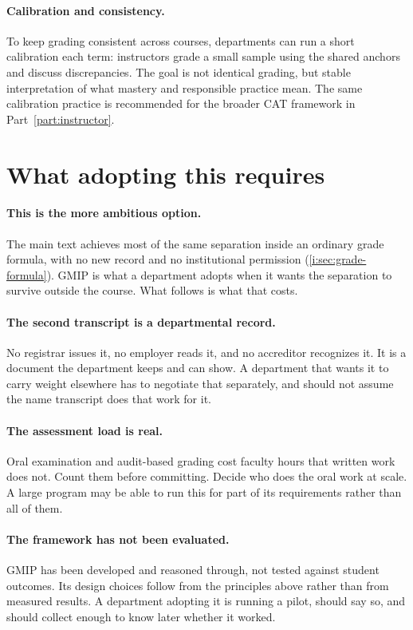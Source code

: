 \documentclass{SIAMbook2023}
\begin{document}
\paragraph{Calibration and consistency.}
To keep grading consistent across courses, departments can run a short calibration each term: instructors grade a small sample using the shared anchors and discuss discrepancies. The goal is not identical grading, but stable interpretation of what mastery and responsible practice mean. The same calibration practice is recommended for the broader CAT framework in Part~\ref{part:instructor}.

\section{What adopting this requires}
\label{app:gmip-adoption}%

\paragraph{This is the more ambitious option.}
The main text achieves most of the same separation inside an ordinary grade formula, with no new record and no institutional permission (\cref{i:sec:grade-formula}). GMIP is what a department adopts when it wants the separation to survive outside the course. What follows is what that costs.

\paragraph{The second transcript is a departmental record.}
No registrar issues it, no employer reads it, and no accreditor recognizes it. It is a document the department keeps and can show. A department that wants it to carry weight elsewhere has to negotiate that separately, and should not assume the name transcript does that work for it.

\paragraph{The assessment load is real.}
Oral examination and audit-based grading cost faculty hours that written work does not. Count them before committing. Decide who does the oral work at scale. A large program may be able to run this for part of its requirements rather than all of them.

\paragraph{The framework has not been evaluated.}
GMIP has been developed and reasoned through, not tested against student outcomes. Its design choices follow from the principles above rather than from measured results. A department adopting it is running a pilot, should say so, and should collect enough to know later whether it worked.
\end{document}
